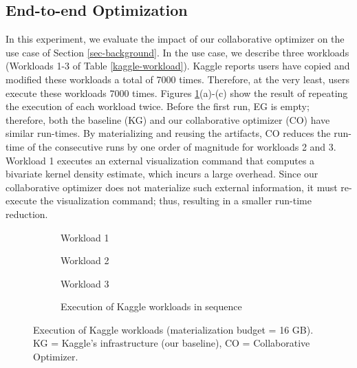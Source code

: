 \subsection{End-to-end Optimization}
In this experiment, we evaluate the impact of our collaborative optimizer on the use case of Section \ref{sec-background}.
In the use case, we describe three workloads (Workloads 1-3 of Table \ref{kaggle-workload}).
Kaggle reports users have copied and modified these workloads a total of 7000 times.
Therefore, at the very least, users execute these workloads 7000 times.
Figures \ref{exp-reuse-kaggle-same-workload}(a)-(c) show the result of repeating the execution of each workload twice.
Before the first run, EG is empty; therefore, both the baseline (KG) and our collaborative optimizer (CO) have similar run-times.
By materializing and reusing the artifacts, CO reduces the run-time of the consecutive runs by one order of magnitude for workloads 2 and 3.
Workload 1 executes an external visualization command that computes a bivariate kernel density estimate, which incurs a large overhead.
Since our collaborative optimizer does not materialize such external information, it must re-execute the visualization command; thus, resulting in a smaller run-time reduction.
\begin{figure}
\begin{subfigure}[b]{0.33\linewidth}
\centering
 \resizebox{\columnwidth}{!}{%
%
}
\caption{Workload 1}
\end{subfigure}%
\begin{subfigure}[b]{0.33\linewidth}
\centering
 \resizebox{\columnwidth}{!}{%
%
}
\caption{Workload 2}
\end{subfigure}%
\begin{subfigure}[b]{0.33\linewidth}
\centering
 \resizebox{\columnwidth}{!}{%
%
}
\caption{Workload 3}
\end{subfigure}
\begin{subfigure}[b]{\linewidth}
\centering
 \resizebox{\columnwidth}{!}{%
%
}
\caption{Execution of Kaggle workloads in sequence}
\end{subfigure}
\caption{Execution of Kaggle workloads (materialization budget = 16 GB). KG = Kaggle's infrastructure (our baseline), CO = Collaborative Optimizer.}
\label{exp-reuse-kaggle-same-workload}
\end{figure}

